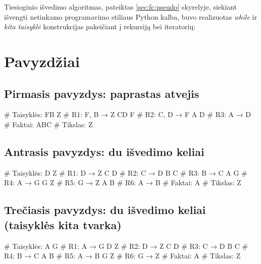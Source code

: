 Tiesioginio išvedimo algoritmas, pateiktas \ref{sec:fc:pseudo}
skyrelyje, siekiant išvengti netinkamo programavimo stiliaus Python
kalba, buvo realizuotas \emph{while} ir \emph{kita taisyklė}
konstrukcijas pakeičiant į rekursiją bei iteratorių:


\section{Pavyzdžiai}

\subsection{Pirmasis pavyzdys: paprastas atvejis}

\begin{pythonaienv}[fc]
# Taisyklės:
FB Z                                    # R1: F, B → Z
CD F                                    # R2: C, D → F
A D                                     # R3: A → D
# Faktai:
ABC
# Tikslas:
Z
\end{pythonaienv}

\subsection{Antrasis pavyzdys: du išvedimo keliai}

\begin{pythonaienv}[fc]
# Taisyklės:
D Z                                     # R1: D → Z
C D                                     # R2: C → D
B C                                     # R3: B → C
A G                                     # R4: A → G
G Z                                     # R5: G → Z
A B                                     # R6: A → B
# Faktai:
A
# Tikslas:
Z
\end{pythonaienv}

\subsection{Trečiasis pavyzdys: du išvedimo keliai (taisyklės kita tvarka)}

\begin{pythonaienv}[fc]
# Taisyklės:
A G                                     # R1: A → G
D Z                                     # R2: D → Z
C D                                     # R3: C → D
B C                                     # R4: B → C
A B                                     # R5: A → B
G Z                                     # R6: G → Z
# Faktai:
A
# Tikslas:
Z
\end{pythonaienv}

